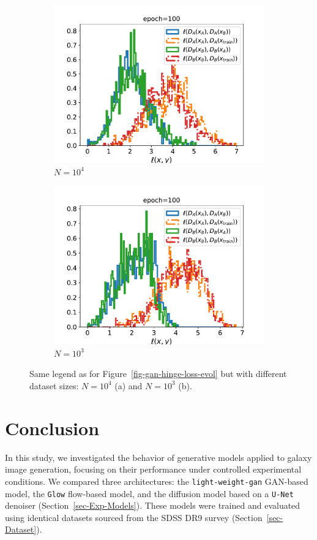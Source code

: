 \documentclass[fleqn,usenatbib]{mnras}
\begin{document}
\begin{figure}
    \centering
        \begin{subfigure}[b]{\columnwidth}
        \centering
        \includegraphics[width=0.8\linewidth]{fig-gan-loss_discri_10000_A_B_num_100.pdf}
        \caption{$N=10^4$}
        \end{subfigure}%
    \hfill
        \begin{subfigure}[b]{\columnwidth}
        \centering
        \includegraphics[width=0.8\linewidth]{fig-gan-loss_discri_1000_A_B_num_100.pdf}
        \caption{$N=10^3$}
        \end{subfigure}%
	\caption{Same legend as for Figure~\ref{fig-gan-hinge-loss-evol} but with different dataset sizes: $N=10^4$ (a) and $N=10^3$ (b).}
	\label{fig-gan-hinge-loss-epoch100-ntrain-10p3-10p4}
\end{figure}
%
\section{Conclusion}
\label{sec-conclusion}
%
In this study, we investigated the behavior of generative models applied to galaxy image generation, focusing on their performance under controlled experimental conditions. We compared three architectures: the \texttt{light-weight-gan} GAN-based model, the \texttt{Glow} flow-based model, and the diffusion model based on a \texttt{U-Net} denoiser (Section~\ref{sec-Exp-Models}). These models were trained and evaluated using identical datasets sourced from the SDSS {\color{red}DR9} survey (Section~\ref{sec-Dataset}).
\end{document}
